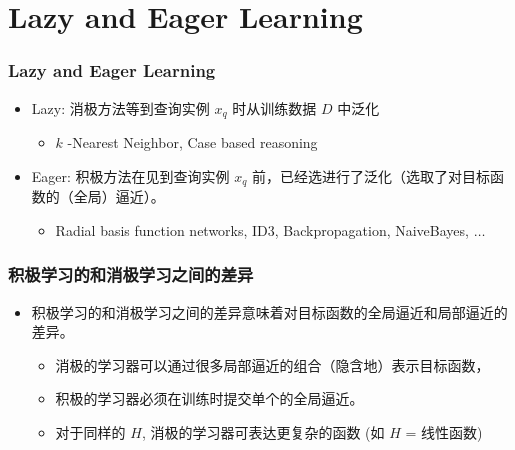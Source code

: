 \documentclass{beamer}
\begin{document}
\section{Lazy and Eager Learning}
\label{sec-6}
\begin{frame}
\frametitle{Lazy and Eager Learning}
\label{sec-6-1}

\begin{itemize}
\item Lazy: 消极方法等到查询实例 $x_q$ 时从训练数据 $D$ 中泛化
\begin{itemize}
\item $k$ -Nearest Neighbor, Case based reasoning
\end{itemize}
\item Eager: 积极方法在见到查询实例 $x_q$ 前，已经选进行了泛化（选取了对目标函数的（全局）逼近）。
\begin{itemize}
\item Radial basis function networks,  ID3, Backpropagation, NaiveBayes, $\ldots$
\end{itemize}
\end{itemize}
\end{frame}
\begin{frame}
\frametitle{积极学习的和消极学习之间的差异}
\label{sec-6-2}

\begin{itemize}
\item 积极学习的和消极学习之间的差异意味着对目标函数的全局逼近和局部逼近的差异。
\begin{itemize}
\item 消极的学习器可以通过很多局部逼近的组合（隐含地）表示目标函数，
\item 积极的学习器必须在训练时提交单个的全局逼近。
\item 对于同样的 $H$, 消极的学习器可表达更复杂的函数 (如 $H$ = 线性函数)
\end{itemize}
\end{itemize}
\end{frame}
\end{document}
